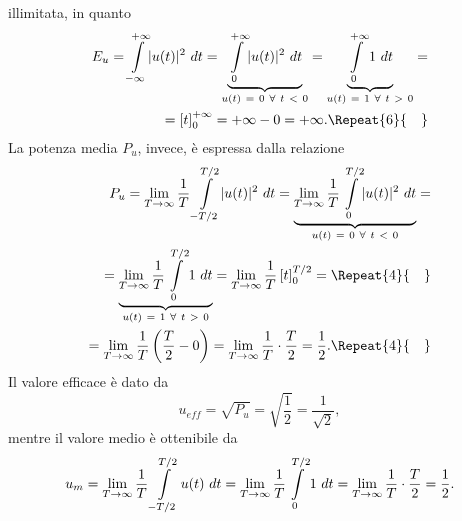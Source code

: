 \documentclass[12pt,oneside,openany]{memoir}
\numberwithin{equation}{subsection}
\DeclarePairedDelimiter{\abs}{\lvert}{\rvert}
\newcommand{\quads}[1]{\Repeat{#1}{\quad}}
\newcommand{\dt}{\ dt}
\begin{document}
illimitata, in quanto
\begin{equation}
	\begin{split}
		E_u = \int\displaylimits_{-\infty}^{+\infty} \abs{u(t)}^2 \dt =
		\underbrace{\int\displaylimits_{0}^{+\infty} \abs{u(t)}^2 \dt}_{
			u(t) \ = \ 0 \ \forall \ t \ < \ 0}
		= \underbrace{\int\displaylimits_{0}^{+\infty} 1 \dt}_{u(t) \
		= \ 1 \ \forall \ t \ > \ 0} =
		\\
		= \left[ t \right]_0^{+\infty} = +\infty - 0 = +\infty.
		\quads{6}
	\end{split}
\end{equation}
La potenza media $P_u$, invece, \`e espressa dalla relazione
\begin{equation}
	\begin{split}
		P_u = \lim_{T \rightarrow \infty} \frac{1}{T} 
		\int\displaylimits_{-T/2}^{T/2} \abs{u(t)}^2 \dt = 
		\underbrace{\lim_{T \rightarrow \infty} \frac{1}{T} 
		\int\displaylimits_{0}^{T/2} \abs{u(t)}^2 \dt}_{u(t) \ = \ 0 \ 
		\forall \ t \ < \ 0} =
		\\
		= \underbrace{\lim_{T \rightarrow \infty} \frac{1}{T} 
		\int\displaylimits_{0}^{T/2} 1 \dt}_{u(t) \ = \ 1 \ \forall \ 
		t \ > \ 0} = \lim_{T \rightarrow \infty} \frac{1}{T} \left[ t 
		\right]_0^{T/2} =
		\quads{4}
		\\
		= \lim_{T \rightarrow \infty} \frac{1}{T} \left(\frac{T}{2} - 0
		\right) = \lim_{T \rightarrow \infty} \frac{1}{T} \cdot 
		\frac{T}{2} = \frac{1}{2}.
		\quads{4}
	\end{split}
\end{equation}
Il valore efficace \`e dato da
\begin{equation}
	u_{eff} = \sqrt{P_u} = \sqrt{\frac{1}{2}} = \frac{1}{\sqrt{2}},
\end{equation}
mentre il valore medio \`e ottenibile da
\begin{equation}
	\begin{split}
		u_m = \lim_{T \rightarrow \infty} \frac{1}{T} 
		\int\displaylimits_{-T/2}^{T/2} u(t) \dt = \lim_{T \rightarrow 
		\infty} \frac{1}{T} \int\displaylimits_{0}^{T/2} 1 \dt = 
		\lim_{T \rightarrow \infty} \frac{1}{T} \cdot \frac{T}{2} = 
		\frac{1}{2}.
	\end{split}
\end{equation}
\end{document}
